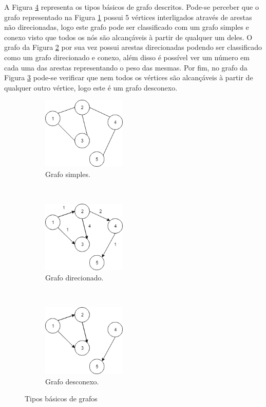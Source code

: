 A Figura \ref{fig_tipos_grafos} representa os tipos básicos de grafo descritos. Pode-se perceber que o grafo representado na Figura \ref{fig_grafo_simples} possui 5 vértices interligados através de arestas não direcionadas, logo este grafo pode ser classificado com um grafo simples e conexo visto que todos os nós são alcançáveis à partir de qualquer um deles. O grafo da Figura \ref{fig_grafo_direcionado} por sua vez possui arestas direcionadas podendo ser classificado como um grafo direcionado e conexo, além disso é possível ver um número em cada uma das arestas representando o peso das mesmas. Por fim, no grafo da Figura \ref{fig_grafo_desconexo} pode-se verificar que nem todos os vértices são alcançáveis à partir de qualquer outro vértice, logo este é um grafo desconexo.

\begin{figure}[t!]
	\centering
	\begin{subfigure}[t]{0.3\textwidth}
		\centering
		\includegraphics[width=4cm]{./figuras/grafo-simples.png} %
		\caption{Grafo simples.}
		\label{fig_grafo_simples}
	\end{subfigure}%
	~
	\begin{subfigure}[t]{0.3\textwidth}
		\centering
		\includegraphics[width=4cm]{./figuras/grafo-direcionado.png} %
	\caption{Grafo direcionado.}
	\label{fig_grafo_direcionado}
	\end{subfigure}
	~
	\begin{subfigure}[t]{0.3\textwidth}
		\centering
		\includegraphics[width=4cm]{./figuras/grafo-desconexo.png} %
	\caption{Grafo desconexo.}
	\label{fig_grafo_desconexo}
	\end{subfigure}
	\caption{Tipos básicos de grafos}
	\label{fig_tipos_grafos}
\end{figure}

